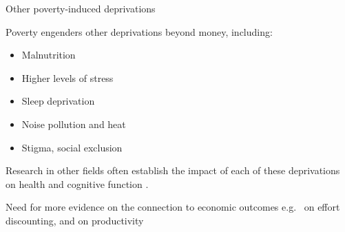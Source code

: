 \documentclass[aspectratio=169, 10pt, handout]{beamer}
\newenvironment{wideitemize}{\itemize\addtolength{\itemsep}{10pt}}{\enditemize}
\begin{document}
\begin{frame}{Other poverty-induced deprivations}

\begin{wideitemize}

	\item Poverty engenders other deprivations beyond money, including:

	\begin{itemize}
	
		\item Malnutrition \citep{fao2018state,schofield2014economic} 

		\item Higher levels of stress \citep{haushofer2014psychology} 
		
		\item Sleep deprivation \citep{grandner2010gets,patel2010sleep} 
		
		\item Noise pollution and heat \citep{harlan2006neighborhood,dean2018}
		
		\item Stigma, social exclusion \citep{hall2014self,mani2017stigma,Chandrasekhar2018}
		
		
	\end{itemize}

	\item Research in other fields often establish the impact of each of these deprivations on health and cognitive function \citep{dean2018poverty}.

	\item Need for more evidence on the connection to economic outcomes e.g.\ \cite{schofield2014economic}  on effort discounting, \cite{rao2018sleepless} and \cite{schilbach2018does} on productivity

		
\end{wideitemize}


\end{frame}
\end{document}
